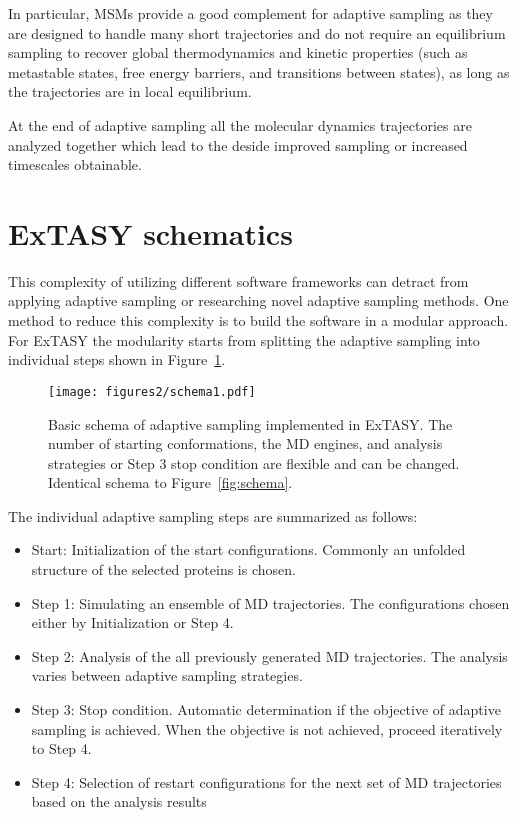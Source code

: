 In particular, MSMs provide a good complement for
adaptive sampling as they are designed to handle many short trajectories and
do not require an equilibrium sampling to recover global thermodynamics and
kinetic properties (such as metastable states, free energy barriers, and
transitions between states), as long as the trajectories are in local
equilibrium.  

At the end of adaptive sampling all the molecular dynamics trajectories are analyzed together which lead to the deside improved sampling or increased timescales obtainable. 




\section{\label{sec:design}ExTASY schematics}

This complexity of utilizing different software frameworks can detract from applying adaptive sampling or researching novel adaptive sampling methods. One method to reduce this complexity is to build the software in a modular approach. For ExTASY the modularity starts from splitting the adaptive sampling into individual steps shown in Figure~\ref{fig:schema2}.

\begin{figure}[h]
  \centering
  \texttt{[image: figures2/schema1.pdf]}
  \caption{Basic schema of adaptive sampling implemented in ExTASY. The
  number of starting conformations, the MD engines, and analysis strategies or Step 3 stop condition are flexible and can be changed. Identical schema to Figure~\ref{fig:schema}.}
  \label{fig:schema2}
\end{figure}

The individual adaptive sampling steps are summarized as follows:
\begin{itemize}
\item Start: Initialization of the start configurations.  Commonly an unfolded structure of the selected proteins is chosen.
\item Step 1: Simulating an ensemble of MD trajectories. The configurations chosen either by Initialization or Step 4. 
\item Step 2: Analysis of the all previously generated MD trajectories. The analysis varies between adaptive sampling strategies.
\item Step 3: Stop condition. Automatic determination if the objective of adaptive sampling is achieved. When the objective is not achieved, proceed iteratively to Step 4. 
\item Step 4: Selection of restart configurations for the next set of MD trajectories based on the analysis results 
\end{itemize}

